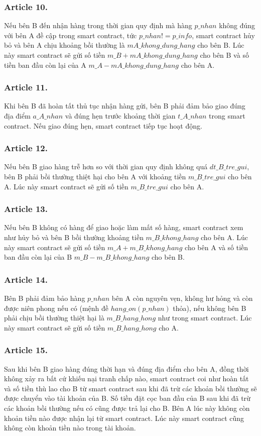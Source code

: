 \subsubsection*{Article 10.}
Nếu bên B đến nhận hàng trong thời gian quy định mà hàng $ p\_nhan $ không đúng với bên A đề cập trong smart contract, tức $ p\_nhan != p\_info $, smart contract hủy bỏ và bên A chịu khoảng bồi thường là $ mA\_khong\_dung\_hang $ cho bên B. Lúc này smart contract sẽ gửi số tiền $ m\_B + mA\_khong\_dung\_hang $ cho bên B và số tiền ban đầu còn lại của A $ m\_A - mA\_khong\_dung\_hang $ cho bên A.

\subsubsection*{Article 11.}
Khi bên B đã hoàn tất thủ tục nhận hàng gửi, bên B phải đảm bảo giao đúng địa điểm $ a\_A\_nhan $ và đúng hẹn trước khoảng thời gian $ t\_A\_nhan $ trong smart contract. Nếu giao đúng hẹn, smart contract tiếp tục hoạt động.

\subsubsection*{Article 12.}
Nếu bên B giao hàng trễ hơn so với thời gian quy định không quá $ dt\_B\_tre\_gui $, bên B phải bồi thường thiệt hại cho bên A với khoảng tiền $ m\_B\_tre\_gui $ cho bên A. Lúc này smart contract sẽ gửi số tiền $ m\_B\_tre\_gui $ cho bên A.

\subsubsection*{Article 13.}
Nếu bên B không có hàng để giao hoặc làm mất số hàng, smart contract xem như hủy bỏ và bên B bồi thường khoảng tiền $ m\_B\_khong\_hang $ cho bên A. Lúc này smart contract sẽ gửi số tiền $ m\_A + m\_B\_khong\_hang $ cho bên A và số tiền ban đầu còn lại của B $ m\_B - m\_B\_khong\_hang $ cho bên B.

\subsubsection*{Article 14.}
Bên B phải đảm bảo hàng $ p\_nhan $ bên A còn nguyên vẹn, không hư hỏng và còn được niên phong nếu có (mệnh đề $ hang\_on(p\_nhan) $ thỏa), nếu không bên B phải chịu bồi thường thiệt hại là $ m\_B\_hang\_hong $ như trong smart contract. Lúc này smart contract sẽ gửi số tiền $ m\_B\_hang\_hong $ cho A.

\subsubsection*{Article 15.}
Sau khi bên B giao hàng đúng thời hạn và đúng địa điểm cho bên A, đồng thời không xảy ra bất cứ khiếu nại tranh chấp nào, smart contract coi như hoàn tất và số tiền thù lao cho B từ smart contract sau khi đã trừ các khoản bồi thường sẽ được chuyển vào tài khoản của B. Số tiền đặt cọc ban đầu của B sau khi đã trừ các khoản bồi thường nếu có cũng được trả lại cho B. Bên A lúc này không còn khoản tiền nào được nhận lại từ smart contract. Lúc này smart contract cũng không còn khoản tiền nào trong tài khoản.